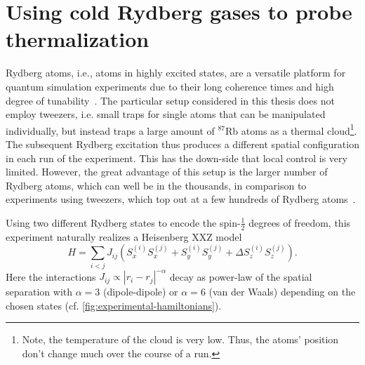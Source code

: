 \section{Using cold Rydberg gases to probe thermalization}\label{sec:Rydberg-experiment}
%
%


Rydberg atoms, i.e., atoms in highly excited states, are a versatile platform for quantum simulation experiments due to their long coherence times and high degree of tunability~\cite{whitlockSimulatingQuantumSpin2017,sibalicRydbergPhysics2018,browaeysManybodyPhysicsIndividually2020a,schollQuantumSimulation2D2021}. The particular setup considered in this thesis does not employ tweezers, i.e. small traps for single atoms that can be manipulated individually, but instead traps a large amount of $^{87}$Rb atoms as a thermal cloud\footnote{Note, the temperature of the cloud is very low. Thus, the atoms' position don't change much over the course of a run.}. The subsequent Rydberg excitation thus produces a different spatial configuration in each run of the experiment. This has the down-side that local control is very limited. However, the great advantage of this setup is the larger number of Rydberg atoms, which can well be in the thousands, in comparison to experiments using tweezers, which top out at a few hundreds of Rydberg atoms~\cite{browaeysManybodyPhysicsIndividually2020a}.

Using two different Rydberg states to encode the spin-$\frac{1}{2}$ degrees of freedom, this experiment naturally realizes a Heisenberg XXZ model~\cite{pineiroorioliRelaxationIsolatedDipolarInteracting2018,signolesGlassyDynamicsDisordered2021}
\begin{equation}\label{eq:heisenberg-hamiltonian}
	H = \sum_{i<j} J_{ij}\left(S_x^{(i)}S_x^{(j)} + S_y^{(i)}S_y^{(j)} + \Delta S_z^{(i)}S_z^{(j)}\right).
\end{equation}
Here the interactions $J_{ij}\propto |r_i-r_j|^{-\alpha}$ decay as power-law of the spatial separation with $\alpha=3$ (dipole-dipole) or $\alpha=6$ (van der Waals) depending on the chosen states (cf. \autoref{fig:experimental-hamiltonians}).

